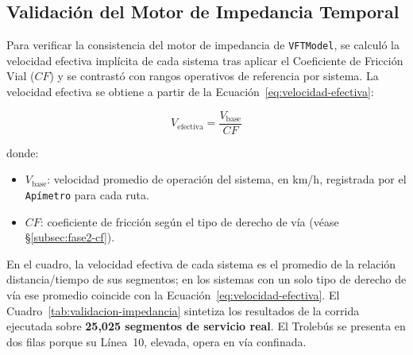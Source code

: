 \subsection{Validación del Motor de Impedancia Temporal}
\label{subsec:validacion-impedancia}

Para verificar la consistencia del motor de impedancia de \texttt{VFTModel},
se calculó la velocidad efectiva implícita de cada sistema tras aplicar el
Coeficiente de Fricción Vial ($CF$) y se contrastó con rangos operativos de
referencia por sistema. La velocidad efectiva se obtiene a partir de la
Ecuación~\eqref{eq:velocidad-efectiva}:

\begin{equation}
    V_{\text{efectiva}} = \frac{V_{\text{base}}}{CF}
    \label{eq:velocidad-efectiva}
\end{equation}

\noindent donde:
\begin{itemize}
    \item $V_{\text{base}}$: velocidad promedio de operación del sistema, en
          km/h, registrada por el \texttt{Apímetro} para cada ruta.
    \item $CF$: coeficiente de fricción según el tipo de derecho de vía
          (véase §\ref{subsec:fase2-cf}).
\end{itemize}

En el cuadro, la velocidad efectiva de cada sistema es el promedio de la
relación distancia/tiempo de sus segmentos; en los sistemas con un solo tipo de
derecho de vía ese promedio coincide con la
Ecuación~\eqref{eq:velocidad-efectiva}. El Cuadro~\ref{tab:validacion-impedancia}
sintetiza los resultados de la corrida ejecutada sobre
\textbf{25{,}025 segmentos de servicio real}. El Trolebús se presenta en dos
filas porque su Línea~10, elevada, opera en vía confinada.

